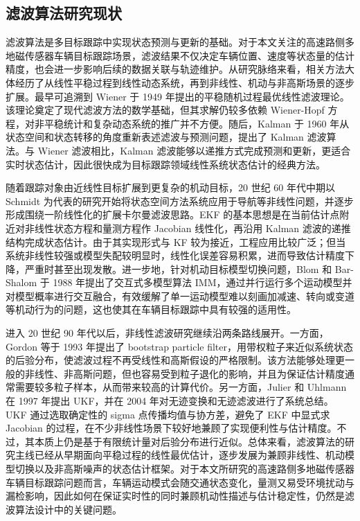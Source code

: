 \documentclass{xdupgthesis}
\begin{document}
\subsection{滤波算法研究现状}
滤波算法是多目标跟踪中实现状态预测与更新的基础。对于本文关注的高速路侧多地磁传感器车辆目标跟踪场景，滤波结果不仅决定车辆位置、速度等状态量的估计精度，也会进一步影响后续的数据关联与轨迹维护。从研究脉络来看，相关方法大体经历了从线性平稳过程到线性动态系统，再到非线性、机动与非高斯场景的逐步扩展。最早可追溯到 Wiener 于 1949 年提出的平稳随机过程最优线性滤波理论\cite{wiener1949extrapolation}。该理论奠定了现代滤波方法的数学基础，但其求解仍较多依赖 Wiener-Hopf 方程，对非平稳统计和复杂动态系统的推广并不方便。随后，Kalman 于 1960 年从状态空间和状态转移的角度重新表述滤波与预测问题，提出了 Kalman 滤波算法\cite{kalman1960linearfiltering}。与 Wiener 滤波相比，Kalman 滤波能够以递推方式完成预测和更新，更适合实时状态估计，因此很快成为目标跟踪领域线性系统状态估计的经典方法。

随着跟踪对象由近线性目标扩展到更复杂的机动目标，20 世纪 60 年代中期以 Schmidt 为代表的研究开始将状态空间方法系统应用于导航等非线性问题，并逐步形成围绕一阶线性化的扩展卡尔曼滤波思路\cite{schmidt1966statespace}。EKF 的基本思想是在当前估计点附近对非线性状态方程和量测方程作 Jacobian 线性化，再沿用 Kalman 滤波的递推结构完成状态估计。由于其实现形式与 KF 较为接近，工程应用比较广泛；但当系统非线性较强或模型失配较明显时，线性化误差容易积累，进而导致估计精度下降，严重时甚至出现发散。进一步地，针对机动目标模型切换问题，Blom 和 Bar-Shalom 于 1988 年提出了交互式多模型算法 IMM\cite{blom1988imm}，通过并行运行多个运动模型并对模型概率进行交互融合，有效缓解了单一运动模型难以刻画加减速、转向或变道等机动行为的问题，这也使其在车辆目标跟踪中具有较强的适用性。

进入 20 世纪 90 年代以后，非线性滤波研究继续沿两条路线展开。一方面，Gordon 等于 1993 年提出了 bootstrap particle filter，用带权粒子来近似系统状态的后验分布，使滤波过程不再受线性和高斯假设的严格限制\cite{gordon1993bootstrap}。该方法能够处理更一般的非线性、非高斯问题，但也容易受到粒子退化的影响，并且为保证估计精度通常需要较多粒子样本，从而带来较高的计算代价。另一方面，Julier 和 Uhlmann 在 1997 年提出 UKF，并在 2004 年对无迹变换和无迹滤波进行了系统总结\cite{julier1997ukf,julier2004unscented}。UKF 通过选取确定性的 sigma 点传播均值与协方差，避免了 EKF 中显式求 Jacobian 的过程，在不少非线性场景下较好地兼顾了实现便利性与估计精度。不过，其本质上仍是基于有限统计量对后验分布进行近似。总体来看，滤波算法的研究主线已经从早期面向平稳过程的线性最优估计，逐步发展为兼顾非线性、机动模型切换以及非高斯噪声的状态估计框架。对于本文所研究的高速路侧多地磁传感器车辆目标跟踪问题而言，车辆运动模式会随交通状态变化，量测又易受环境扰动与漏检影响，因此如何在保证实时性的同时兼顾机动性描述与估计稳定性，仍然是滤波算法设计中的关键问题。
\end{document}
